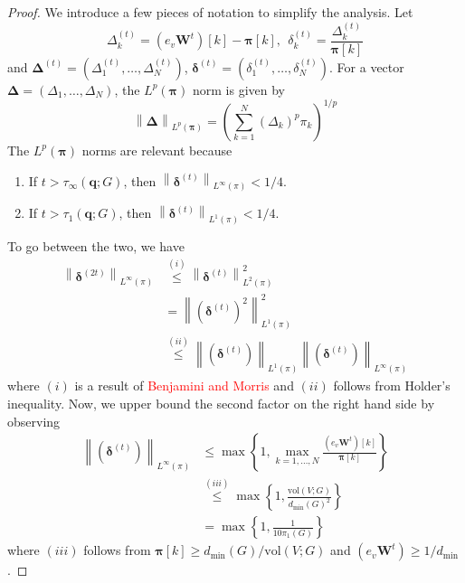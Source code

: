 \documentclass{article}
\newcommand{\vol}{\mathrm{vol}}
\newcommand{\norm}[1]{\left\lVert#1\right\rVert}
\newcommand{\1}{\mathbf{1}}
\newcommand{\qbf}{\mathbf{q}}
\newcommand{\pibf}{\bm{\pi}}
\newcommand{\Deltabf}{\bm{\Delta}}
\newcommand{\deltabf}{\bm{\delta}}
\newcommand{\Wbf}{\mathbf{W}}
\theoremstyle{aldenthm}
\begin{document}
\begin{proof}
	We introduce a few pieces of notation to simplify the analysis. Let
	\begin{equation*}
	\Delta_k^{(t)} = (e_v\Wbf^t)[k] - \pibf[k], ~~ \delta_k^{(t)} = \frac{\Delta_k^{(t)}}{\pibf[k]}
	\end{equation*}
	and $\Deltabf^{(t)} = (\Delta_1^{(t)}, \ldots, \Delta_N^{(t)})$, $\deltabf^{(t)} = (\delta_1^{(t)}, \ldots, \delta_N^{(t)})$. For a vector $\Deltabf = (\Delta_1, \ldots, \Delta_{N})$, the $L^{p}(\pibf)$ norm is given by
	\begin{equation*}
	\norm{\Deltabf}_{L^p(\pibf)} = \left(\sum_{k = 1}^{N} \left(\Delta_k\right)^{p} \pi_k \right)^{1/p}
	\end{equation*}
	The $L^{p}(\pibf)$ norms are relevant because
	\begin{enumerate}
		\item If $t > \tau_{\infty}(\qbf; G)$, then $\norm{\deltabf^{(t)}}_{L^{\infty}(\pi)} < 1/4$. 
		\item If $t > \tau_{1}(\qbf; G)$, then 
		$\norm{\deltabf^{(t)}}_{L^{1}(\pi)} < 1/4$.
	\end{enumerate}
	
	To go between the two, we have
	\begin{align*}
	\norm{\deltabf^{(2t)}}_{L^{\infty}(\pi)} & \overset{(i)}{\leq} \norm{\deltabf^{(t)}}^2_{L^{2}(\pi)} \\
	& = \norm{(\deltabf^{(t)})^2}^2_{L^{1}(\pi)} \\
	& \overset{(ii)}{\leq}  \norm{(\deltabf^{(t)})}_{L^{1}(\pi)} \norm{(\deltabf^{(t)})}_{L^{\infty}(\pi)}
	\end{align*}
	where $(i)$ is a result of \textcolor{red}{Benjamini and Morris} and $(ii)$ follows from Holder's inequality. Now, we upper bound the second factor on the right hand side by observing
	\begin{align*}
	\norm{(\deltabf^{(t)})}_{L^{\infty}(\pi)} & \leq \max\left\{1, \max_{k  = 1,\ldots,N} \frac{(e_v\Wbf^t)[k]}{\pibf[k]} \right\} \\
	& \overset{(iii)}{\leq} \max\left\{1, \frac{\vol(V; G)}{d_{\min}(G)^2} \right\} \\
	& = \max\left\{1, \frac{1}{10 \pi_1(G)}\right\}
	\end{align*}
	where $(iii)$ follows from $\pibf[k] \geq d_{\min}(G) / \vol(V; G)$ and $(e_v\Wbf^t) \geq 1/d_{\min}$.
	

\end{proof}
\end{document}
